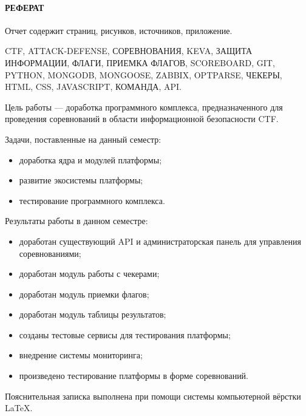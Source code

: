\newpage
{}
\paragraph{\hfill РЕФЕРАТ \hfill}

Отчет содержит  страниц,  рисунков,  источников,  приложение.

CTF, ATTACK-DEFENSE, СОРЕВНОВАНИЯ, KEVA, ЗАЩИТА ИНФОРМАЦИИ, ФЛАГИ, ПРИЕМКА ФЛАГОВ, SCOREBOARD, GIT, PYTHON, MONGODB, MONGOOSE, ZABBIX, OPTPARSE, ЧЕКЕРЫ, HTML, CSS, JAVASCRIPT, КОМАНДА, API.

Цель работы --- доработка программного комплекса, предназначенного для проведения соревнований в области информационной безопасности CTF.

Задачи, поставленные на данный семестр: 
\begin{itemize}
\item доработка ядра и модулей платформы;
\item развитие экосистемы платформы; 
\item тестирование программного комплекса.
\end{itemize}

Результаты работы в данном семестре:

\begin{itemize}
\item доработан существующий API и администраторская панель для управления соревнованиями; 
\item доработан модуль работы с чекерами;
\item доработан модуль приемки флагов;
\item доработан модуль таблицы результатов;
\item созданы тестовые сервисы для тестирования платформы;
\item внедрение системы мониторинга;
\item произведено тестирование платформы в форме соревнований.
\end{itemize}

Пояснительная записка выполнена при помощи системы компьютерной вёрстки \LaTeX.
